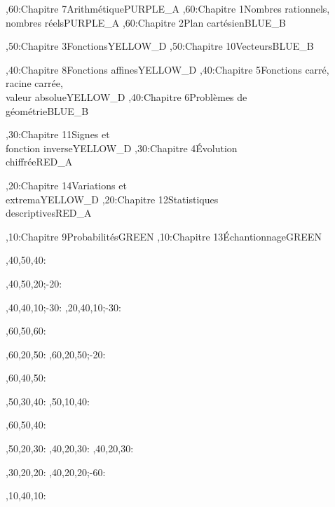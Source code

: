 \documentclass[tikz]{standalone}
\begin{document}
%
	\begin{chart}
	,60:{Chapitre 7}{Arithmétique}{}{PURPLE_A}
	,60:{Chapitre 1}{Nombres rationnels, \\ nombres réels}{}{PURPLE_A}
	,60:{Chapitre 2}{Plan cartésien}{}{BLUE_B}
	
	,50:{Chapitre 3}{Fonctions}{}{YELLOW_D}
	,50:{Chapitre 10}{Vecteurs}{}{BLUE_B}
	
	,40:{Chapitre 8}{Fonctions affines}{}{YELLOW_D}
	,40:{Chapitre 5}{Fonctions carré, \\ racine carrée, \\ valeur absolue}{}{YELLOW_D}
	,40:{Chapitre 6}{Problèmes de \\ géométrie}{}{BLUE_B}
	
	,30:{Chapitre 11}{Signes et \\ fonction inverse}{}{YELLOW_D}
	,30:{Chapitre 4}{Évolution \\ chiffrée}{}{RED_A}
	
	,20:{Chapitre 14}{Variations et \\ extrema}{}{YELLOW_D}
	,20:{Chapitre 12}{Statistiques \\ descriptives}{}{RED_A}
	
	,10:{Chapitre 9}{Probabilités}{}{GREEN}
	,10:{Chapitre 13}{Échantionnage}{}{GREEN}
	
	
	
	
	,40,50,40:
	
	
	
	,40,50,20;-20:
	
	,40,40,10;-30:
	,20,40,10;-30:

	,60,50,60:
	
	,60,20,50:
	,60,20,50;-20:
	
	,60,40,50:
	
	,50,30,40:
	,50,10,40:
	
	,60,50,40:
	
	,50,20,30:
	,40,20,30:
	,40,20,30:
	
	,30,20,20:
	,40,20,20;-60:
	
	,10,40,10:
	
	\end{chart}
%
\end{document}
